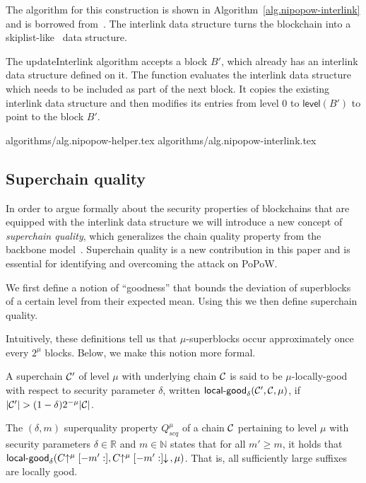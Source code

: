 %

The algorithm
for this construction is shown in Algorithm~\ref{alg.nipopow-interlink} and is
borrowed from~\cite{KLS}.
The interlink data structure turns the blockchain into a
skiplist-like~\cite{skiplist} data structure.

The updateInterlink algorithm accepts a block $B'$, which already has an
interlink data structure defined on it. The function evaluates the
interlink data structure which needs to be included as part of the next block.
It copies the existing interlink data structure and
then modifies its entries from level $0$ to $\textsf{level}(B')$ to
point to the block $B'$.

{algorithms/alg.nipopow-helper.tex}
{algorithms/alg.nipopow-interlink.tex}

\subsection{Superchain quality}
In order to argue formally about the security properties of blockchains that are
equipped with the interlink data structure we will introduce a new concept of
{\em superchain quality}, which generalizes the chain quality property from the
backbone model~\cite{backbone}. Superchain quality is a new contribution in this
paper and is essential for identifying and overcoming the attack on PoPoW.

We first define a notion of ``goodness'' that bounds the deviation of
superblocks of a certain level from their expected mean. Using this we then
define superchain quality.

Intuitively, these definitions tell us that $\mu$-superblocks occur
approximately once every $2^\mu$ blocks. Below, we make this notion more formal.

\begin{definition}
A superchain $\mathcal{C}'$ of level
$\mu$ with underlying chain $\mathcal{C}$ is said to be $\mu$-\textnormal{locally-good}
with respect to security parameter $\delta$, written
$\textsf{local-good}_{\delta}(\mathcal{C}', \mathcal{C}, \mu)$, if $|\mathcal{C}'| > (1 -
\delta)2^{-\mu}|\mathcal{C}|$.
\end{definition}

\begin{definition}
The $(\delta, m)$ superquality property $Q^\mu_{scq}$ of a chain $\mathcal{C}$
pertaining to level $\mu$ with security parameters $\delta \in \mathbb{R}$ and
$m \in \mathbb{N}$ states that for all $m' \geq m$, it holds that
$\textsf{local-good}_{\delta}(C\negthickspace\uparrow^\mu[-m':],
C\negthickspace\uparrow^\mu[-m':]\negthickspace\downarrow\,, \mu)$. That is, all sufficiently large suffixes
are locally good.
\end{definition}

